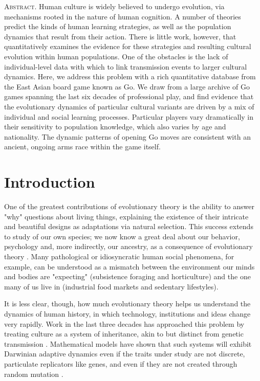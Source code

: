 \documentclass[reqno,12pt]{amsart}
\begin{document}
\maketitle

\noindent\textsc{Abstract.}
Human culture is widely believed to undergo evolution, via mechanisms rooted in the nature of human cognition. A number of theories predict the kinds of human learning strategies, as well as the population dynamics that result from their action. There is little work, however, that quantitatively examines the evidence for these strategies and resulting cultural evolution within human populations. One of the obstacles is the lack of individual-level data with which to link transmission events to larger cultural dynamics. Here, we address this problem with a rich quantitative database from the East Asian board game known as Go. We draw from a large archive of Go games spanning the last six decades of professional play, and find evidence that the evolutionary dynamics of particular cultural variants are driven by a mix of individual and social learning processes. Particular players vary dramatically in their sensitivity to population knowledge, which also varies by age and nationality. The dynamic patterns of opening Go moves are consistent with an ancient, ongoing arms race within the game itself.

\vspace{12pt}

\vspace{24pt}


\section{Introduction}

One of the greatest contributions of evolutionary theory is the ability to answer "why" questions about living things, explaining the existence of their intricate and beautiful designs as adaptations via natural selection. This success extends to study of our own species; we now know a great deal about our behavior, psychology and, more indirectly, our ancestry, as a consequence of evolutionary theory \citep{barkow1992adaptedmind, laland2002sense}. Many pathological or idiosyncratic human social phenomena, for example, can be understood as a mismatch between the environment our minds and bodies are "expecting" (subsistence foraging and horticulture) and the one many of us live in (industrial food markets and sedentary lifestyles).

It is less clear, though, how much evolutionary theory helps us understand the dynamics of human history, in which technology, institutions and ideas change very rapidly. Work in the last three decades has approached this problem by treating culture as a system of inheritance, akin to but distinct from genetic transmission \citep{durham1992coevolution, richerson2005genesalone}. Mathematical models have shown that such systems will exhibit Darwinian adaptive dynamics even if the traits under study are not discrete, particulate replicators like genes, and even if they are not created through random mutation \citep{boyd1985culture, henrich2002replicators}.
\end{document}
